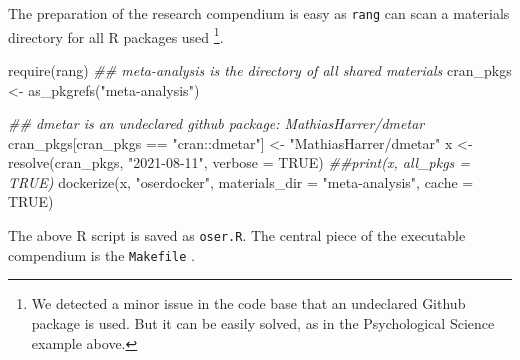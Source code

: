 \documentclass[
  10pt,
  letterpaper,
]{article}
\newenvironment{Shaded}{\begin{snugshade}}{\end{snugshade}}
\newcommand{\AttributeTok}[1]{\textcolor[rgb]{0.40,0.45,0.13}{#1}}
\newcommand{\ConstantTok}[1]{\textcolor[rgb]{0.56,0.35,0.01}{#1}}
\newcommand{\DocumentationTok}[1]{\textcolor[rgb]{0.37,0.37,0.37}{\textit{#1}}}
\newcommand{\FunctionTok}[1]{\textcolor[rgb]{0.28,0.35,0.67}{#1}}
\newcommand{\NormalTok}[1]{\textcolor[rgb]{0.00,0.23,0.31}{#1}}
\newcommand{\OtherTok}[1]{\textcolor[rgb]{0.00,0.23,0.31}{#1}}
\newcommand{\SpecialCharTok}[1]{\textcolor[rgb]{0.37,0.37,0.37}{#1}}
\newcommand{\StringTok}[1]{\textcolor[rgb]{0.13,0.47,0.30}{#1}}
\begin{document}
The preparation of the research compendium is easy as \texttt{rang} can
scan a materials directory for all R packages used \footnote{We detected
  a minor issue in the code base that an undeclared Github package is
  used. But it can be easily solved, as in the Psychological Science
  example above.}.

\begin{Shaded}
\begin{Highlighting}[]
\FunctionTok{require}\NormalTok{(rang)}
\DocumentationTok{\#\# meta{-}analysis is the directory of all shared materials}
\NormalTok{cran\_pkgs }\OtherTok{\textless{}{-}} \FunctionTok{as\_pkgrefs}\NormalTok{(}\StringTok{"meta{-}analysis"}\NormalTok{) }

\DocumentationTok{\#\# dmetar is an undeclared github package: MathiasHarrer/dmetar}
\NormalTok{cran\_pkgs[cran\_pkgs }\SpecialCharTok{==} \StringTok{"cran::dmetar"}\NormalTok{] }\OtherTok{\textless{}{-}} \StringTok{"MathiasHarrer/dmetar"}
\NormalTok{x }\OtherTok{\textless{}{-}} \FunctionTok{resolve}\NormalTok{(cran\_pkgs, }\StringTok{"2021{-}08{-}11"}\NormalTok{, }\AttributeTok{verbose =} \ConstantTok{TRUE}\NormalTok{)}
\DocumentationTok{\#\#print(x, all\_pkgs = TRUE)}
\FunctionTok{dockerize}\NormalTok{(x, }\StringTok{"oserdocker"}\NormalTok{, }\AttributeTok{materials\_dir =} \StringTok{"meta{-}analysis"}\NormalTok{, }\AttributeTok{cache =} \ConstantTok{TRUE}\NormalTok{)}
\end{Highlighting}
\end{Shaded}

The above R script is saved as \texttt{oser.R}. The central piece of the
executable compendium is the \texttt{Makefile} \citep{baker:2020:UGM}.
\end{document}
